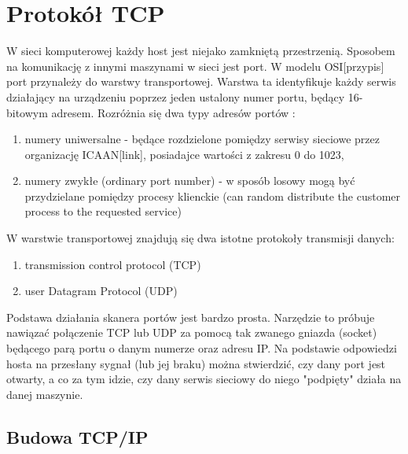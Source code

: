 \section{Protokół TCP}

W sieci komputerowej każdy host jest niejako zamkniętą przestrzenią. Sposobem na komunikację z innymi maszynami w sieci jest port. W modelu OSI[przypis] port przynależy do warstwy transportowej. Warstwa ta identyfikuje każdy serwis działający na urządzeniu poprzez jeden ustalony numer portu, będący 16-bitowym adresem. Rozróżnia się dwa typy adresów portów \cite{Liang2013}:
\begin{enumerate}
\item numery uniwersalne - będące rozdzielone pomiędzy serwisy sieciowe przez organizację ICAAN[link], posiadajce wartości z zakresu 0 do 1023,
\item numery zwykłe (ordinary port number) - w sposób losowy mogą być przydzielane pomiędzy procesy klienckie (can random distribute the customer process to the requested service)
\end{enumerate}



W warstwie transportowej znajdują się dwa istotne protokoły transmisji danych:
\begin{enumerate}
\item transmission control protocol (TCP)
\item user Datagram Protocol (UDP)
\end{enumerate}

Podstawa działania skanera portów jest bardzo prosta. Narzędzie to próbuje nawiązać połączenie TCP lub UDP za pomocą tak zwanego gniazda (socket) będącego parą portu o danym numerze oraz adresu IP. Na podstawie odpowiedzi hosta na przesłany sygnał (lub jej braku) można stwierdzić, czy dany port jest otwarty, a co za tym idzie, czy dany serwis sieciowy do niego "podpięty" działa na danej maszynie.






\subsection{Budowa TCP/IP}

